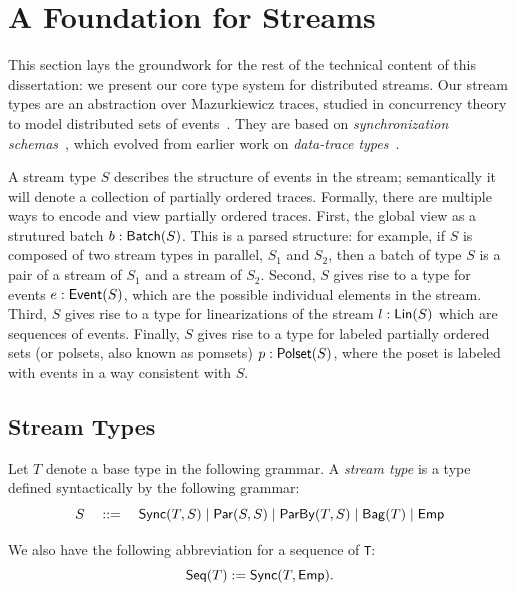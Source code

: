 \chapter{A Foundation for Streams}
\label{cha:foundation}

This section lays the groundwork for the rest of the technical content of this dissertation: we present our core type system for distributed streams.
Our stream types are an abstraction over Mazurkiewicz traces, studied in concurrency theory to model distributed sets of events~\cite{mazurkiewicz1986trace,DiekertR1995}.
They are based on \emph{synchronization schemas}~, which evolved from earlier work on \emph{data-trace types}~.

A stream type $S$ describes the structure of events in the stream;
semantically it will denote a collection of partially ordered traces.
Formally, there are multiple ways to encode and view partially ordered traces.
First, the global view as a strutured batch $b: \mathsf{Batch}({S})$.
This is a parsed structure: for example, if $S$ is composed of two stream types in parallel, $S_1$ and $S_2$, then a batch of type $S$ is a pair of a stream of $S_1$ and a stream of $S_2$.
Second, $S$ gives rise to a type for events $e: \mathsf{Event}({S})$,
which are the possible individual elements in the stream.
Third, $S$ gives rise to a type for linearizations of the stream $l: \mathsf{Lin}({S})$
which are sequences of events.
Finally, $S$ gives rise to a type for labeled partially ordered sets (or polsets, also known as pomsets)
$p: \mathsf{Polset}({S})$, where the poset is labeled with events in a way consistent with $S$.

\section{Stream Types}

\begin{definition}
Let $T$ denote a base type in the following grammar.
A \emph{stream type} is a type defined syntactically by the following grammar:
\[
  S \quad ::= \quad
    \mathsf{Sync}({T}, S) \mid
    \mathsf{Par}({S}, {S}) \mid
    \mathsf{ParBy}({T}, S) \mid
    \mathsf{Bag}({T}) \mid
    \mathsf{Emp}{}
\]
\end{definition}

We also have the following abbreviation for a sequence of \texttt{T}:
\[
  \mathsf{Seq}({T}) := \mathsf{Sync}({T}, \mathsf{Emp}{}).
\]

